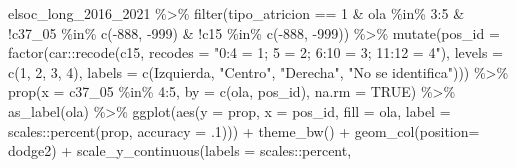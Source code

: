 \documentclass[
  12pt,
]{book}
\newenvironment{Shaded}{\begin{snugshade}}{\end{snugshade}}
\newcommand{\AttributeTok}[1]{\textcolor[rgb]{0.77,0.63,0.00}{#1}}
\newcommand{\ConstantTok}[1]{\textcolor[rgb]{0.00,0.00,0.00}{#1}}
\newcommand{\DecValTok}[1]{\textcolor[rgb]{0.00,0.00,0.81}{#1}}
\newcommand{\FunctionTok}[1]{\textcolor[rgb]{0.00,0.00,0.00}{#1}}
\newcommand{\NormalTok}[1]{#1}
\newcommand{\SpecialCharTok}[1]{\textcolor[rgb]{0.00,0.00,0.00}{#1}}
\newcommand{\StringTok}[1]{\textcolor[rgb]{0.31,0.60,0.02}{#1}}
\begin{document}
\begin{Shaded}
\begin{Highlighting}[]
\NormalTok{elsoc\_long\_2016\_2021 }\SpecialCharTok{\%\textgreater{}\%}
  \FunctionTok{filter}\NormalTok{(tipo\_atricion }\SpecialCharTok{==} \DecValTok{1} \SpecialCharTok{\&}\NormalTok{ ola }\SpecialCharTok{\%in\%} \DecValTok{3}\SpecialCharTok{:}\DecValTok{5} \SpecialCharTok{\&} 
           \SpecialCharTok{!}\NormalTok{c37\_05 }\SpecialCharTok{\%in\%} \FunctionTok{c}\NormalTok{(}\SpecialCharTok{{-}}\DecValTok{888}\NormalTok{, }\SpecialCharTok{{-}}\DecValTok{999}\NormalTok{) }\SpecialCharTok{\&} \SpecialCharTok{!}\NormalTok{c15 }\SpecialCharTok{\%in\%} \FunctionTok{c}\NormalTok{(}\SpecialCharTok{{-}}\DecValTok{888}\NormalTok{, }\SpecialCharTok{{-}}\DecValTok{999}\NormalTok{)) }\SpecialCharTok{\%\textgreater{}\%}
    \FunctionTok{mutate}\NormalTok{(}\AttributeTok{pos\_id =} \FunctionTok{factor}\NormalTok{(car}\SpecialCharTok{::}\FunctionTok{recode}\NormalTok{(c15, }\AttributeTok{recodes =} \StringTok{"0:4 = 1; 5 = 2; 6:10 = 3; 11:12 = 4"}\NormalTok{),}
                         \AttributeTok{levels =} \FunctionTok{c}\NormalTok{(}\DecValTok{1}\NormalTok{, }\DecValTok{2}\NormalTok{, }\DecValTok{3}\NormalTok{, }\DecValTok{4}\NormalTok{),}
                         \AttributeTok{labels =} \FunctionTok{c}\NormalTok{(}\StringTok{\textquotesingle{}Izquierda\textquotesingle{}}\NormalTok{, }\StringTok{"Centro"}\NormalTok{, }\StringTok{"Derecha"}\NormalTok{, }\StringTok{"No se identifica"}\NormalTok{))) }\SpecialCharTok{\%\textgreater{}\%}
  \FunctionTok{prop}\NormalTok{(}\AttributeTok{x =}\NormalTok{ c37\_05 }\SpecialCharTok{\%in\%} \DecValTok{4}\SpecialCharTok{:}\DecValTok{5}\NormalTok{, }\AttributeTok{by =} \FunctionTok{c}\NormalTok{(ola, pos\_id), }\AttributeTok{na.rm =} \ConstantTok{TRUE}\NormalTok{) }\SpecialCharTok{\%\textgreater{}\%} 
  \FunctionTok{as\_label}\NormalTok{(ola) }\SpecialCharTok{\%\textgreater{}\%} 
  \FunctionTok{ggplot}\NormalTok{(}\FunctionTok{aes}\NormalTok{(}\AttributeTok{y =}\NormalTok{ prop, }\AttributeTok{x =}\NormalTok{ pos\_id, }\AttributeTok{fill =}\NormalTok{ ola, }
               \AttributeTok{label =}\NormalTok{ scales}\SpecialCharTok{::}\FunctionTok{percent}\NormalTok{(prop, }\AttributeTok{accuracy =}\NormalTok{ .}\DecValTok{1}\NormalTok{))) }\SpecialCharTok{+}
    \FunctionTok{theme\_bw}\NormalTok{() }\SpecialCharTok{+} 
    \FunctionTok{geom\_col}\NormalTok{(}\AttributeTok{position=} \StringTok{\textquotesingle{}dodge2\textquotesingle{}}\NormalTok{) }\SpecialCharTok{+}
    \FunctionTok{scale\_y\_continuous}\NormalTok{(}\AttributeTok{labels =}\NormalTok{ scales}\SpecialCharTok{::}\NormalTok{percent,}

\end{Highlighting}
\end{Shaded}
\end{document}
